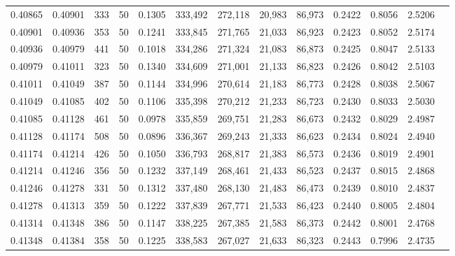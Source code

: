 \begin{tabular}{rrrrrrrrrrrrr}
0.40865 & 0.40901 &   333 &  50 &                                     0.1305 & 333,492 & 272,118 &  20,983 &  86,973 & 0.2422 & 0.8056 & 2.5206 \\
0.40901 & 0.40936 &   353 &  50 &                                     0.1241 & 333,845 & 271,765 &  21,033 &  86,923 & 0.2423 & 0.8052 & 2.5174 \\
0.40936 & 0.40979 &   441 &  50 &                                     0.1018 & 334,286 & 271,324 &  21,083 &  86,873 & 0.2425 & 0.8047 & 2.5133 \\
0.40979 & 0.41011 &   323 &  50 &                                     0.1340 & 334,609 & 271,001 &  21,133 &  86,823 & 0.2426 & 0.8042 & 2.5103 \\
0.41011 & 0.41049 &   387 &  50 &                                     0.1144 & 334,996 & 270,614 &  21,183 &  86,773 & 0.2428 & 0.8038 & 2.5067 \\
0.41049 & 0.41085 &   402 &  50 &                                     0.1106 & 335,398 & 270,212 &  21,233 &  86,723 & 0.2430 & 0.8033 & 2.5030 \\
0.41085 & 0.41128 &   461 &  50 &                                     0.0978 & 335,859 & 269,751 &  21,283 &  86,673 & 0.2432 & 0.8029 & 2.4987 \\
0.41128 & 0.41174 &   508 &  50 &                                     0.0896 & 336,367 & 269,243 &  21,333 &  86,623 & 0.2434 & 0.8024 & 2.4940 \\
0.41174 & 0.41214 &   426 &  50 &                                     0.1050 & 336,793 & 268,817 &  21,383 &  86,573 & 0.2436 & 0.8019 & 2.4901 \\
0.41214 & 0.41246 &   356 &  50 &                                     0.1232 & 337,149 & 268,461 &  21,433 &  86,523 & 0.2437 & 0.8015 & 2.4868 \\
0.41246 & 0.41278 &   331 &  50 &                                     0.1312 & 337,480 & 268,130 &  21,483 &  86,473 & 0.2439 & 0.8010 & 2.4837 \\
0.41278 & 0.41313 &   359 &  50 &                                     0.1222 & 337,839 & 267,771 &  21,533 &  86,423 & 0.2440 & 0.8005 & 2.4804 \\
0.41314 & 0.41348 &   386 &  50 &                                     0.1147 & 338,225 & 267,385 &  21,583 &  86,373 & 0.2442 & 0.8001 & 2.4768 \\
0.41348 & 0.41384 &   358 &  50 &                                     0.1225 & 338,583 & 267,027 &  21,633 &  86,323 & 0.2443 & 0.7996 & 2.4735 \\

\end{tabular}
